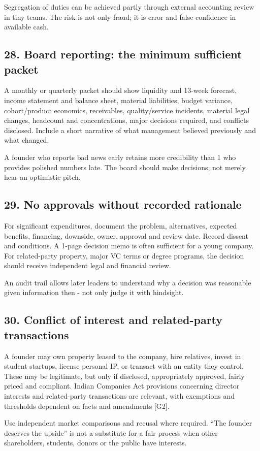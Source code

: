Segregation of duties can be achieved partly through external accounting review in tiny teams. The risk is not only fraud; it is error and false confidence in available cash.

\subsection{28. Board reporting: the minimum sufficient packet}

A monthly or quarterly packet should show liquidity and 13-week forecast, income statement and balance sheet, material liabilities, budget variance, cohort/product economics, receivables, quality/service incidents, material legal changes, headcount and concentrations, major decisions required, and conflicts disclosed. Include a short narrative of what management believed previously and what changed.

A founder who reports bad news early retains more credibility than 1 who provides polished numbers late. The board should make decisions, not merely hear an optimistic pitch.

\subsection{29. No approvals without recorded rationale}

For significant expenditures, document the problem, alternatives, expected benefits, financing, downside, owner, approval and review date. Record dissent and conditions. A 1-page decision memo is often sufficient for a young company. For related-party property, major VC terms or degree programs, the decision should receive independent legal and financial review.

An audit trail allows later leaders to understand why a decision was reasonable given information then - not only judge it with hindsight.

\subsection{30. Conflict of interest and related-party transactions}

A founder may own property leased to the company, hire relatives, invest in student startups, license personal IP, or transact with an entity they control. These may be legitimate, but only if disclosed, appropriately approved, fairly priced and compliant. Indian Companies Act provisions concerning director interests and related-party transactions are relevant, with exemptions and thresholds dependent on facts and amendments [G2].

Use independent market comparisons and recusal where required. ``The founder deserves the upside'' is not a substitute for a fair process when other shareholders, students, donors or the public have interests.
